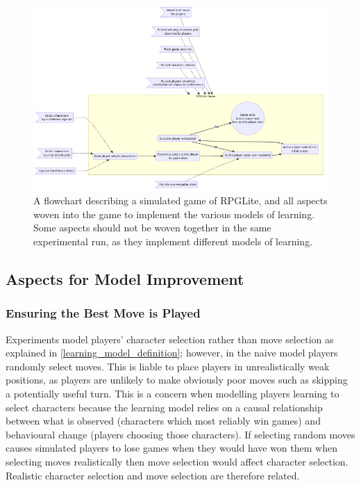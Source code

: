 \begin{figure}[h]
  \centering
  \includegraphics[width=\columnwidth]{60_optimisation_with_aspects/diagrams/aspect_applied_model.png}
  \caption{A flowchart describing a simulated game of RPGLite, and all aspects woven into the game to implement the various models of learning. Some aspects should not be woven together in the same experimental run, as they implement different models of learning.}
  \label{fig:all_aspects_applied}
\end{figure}


\subsection{Aspects for Model Improvement}\label{subsec:aspects_improving_model}

\subsubsection{Ensuring the Best Move is Played}\label{aspect_to_ensure_best_move}



Experiments model players' character selection rather than move selection as
explained in \cref{learning_model_definition}; however, in the naive model
players randomly select moves. This is liable to place players in
unrealistically weak positions, as players are unlikely to make obviously poor
moves such as skipping a potentially useful turn. This is a concern when
modelling players learning to select characters because the learning model
relies on a causal relationship between what is observed (characters which most
reliably win games) and behavioural change (players choosing those characters).
If selecting random moves causes simulated players to lose games when they would
have won them when selecting moves realistically then move selection would
affect character selection. Realistic character selection and move selection are
therefore related.

